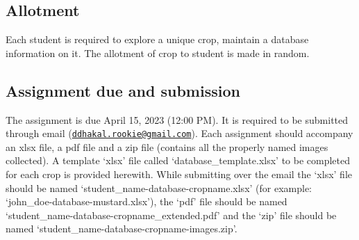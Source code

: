 \documentclass[
]{article}
\begin{document}
\hypertarget{allotment}{%
\subsection{Allotment}\label{allotment}}

Each student is required to explore a unique crop, maintain a database information on it. The allotment of crop to student is made in random.

\hypertarget{assignment-due-and-submission}{%
\subsection{Assignment due and submission}\label{assignment-due-and-submission}}

The assignment is due April 15, 2023 (12:00 PM). It is required to be submitted through email (\href{mailto:ddhakal.rookie@gmail.com}{\nolinkurl{ddhakal.rookie@gmail.com}}). Each assignment should accompany an xlsx file, a pdf file and a zip file (contains all the properly named images collected). A template `xlsx' file called `database\_template.xlsx' to be completed for each crop is provided herewith. While submitting over the email the `xlsx' file should be named `student\_name-database-cropname.xlsx' (for example: `john\_doe-database-mustard.xlsx'), the `pdf' file should be named `student\_name-database-cropname\_extended.pdf' and the `zip' file should be named `student\_name-database-cropname-images.zip'.
\end{document}

